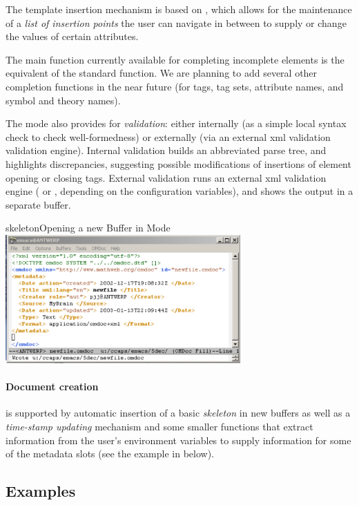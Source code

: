The template insertion mechanism is based on {}, which allows for the
maintenance of a {\emph{list of insertion points}} the user can navigate in between to
supply or change the values of certain attributes.

The main function currently available for completing incomplete elements is the equivalent
of the standard {} function.  We are planning to add several other
completion functions in the near future (for tags, tag sets, attribute names, and symbol
and theory names).

The mode also provides for {\emph{validation}}: either internally (as a simple local
syntax check to check well-formedness) or externally (via an external xml validation
validation engine).  Internal validation builds an abbreviated parse tree, and highlights
discrepancies, suggesting possible modifications of insertions of element opening or
closing tags.  External validation runs an external xml validation engine ({\rxp} or
{\nsgmls}, depending on the configuration variables), and shows the output in a separate
buffer.

\begin{myfig}{skeleton}{Opening a new Buffer in {\omdoc} Mode}
  \includegraphics[width=9cm]{projects/omdocmode/omdoc2c}
\end{myfig}

\paragraph{Document creation}
is supported by automatic insertion of a basic {\emph{{\omdoc} skeleton}} in new buffers
as well as a {\emph{time-stamp updating}} mechanism and some smaller functions that extract
information from the user's environment variables to supply information for some of the
metadata slots (see the example in {} below).

\subsection{Examples}

